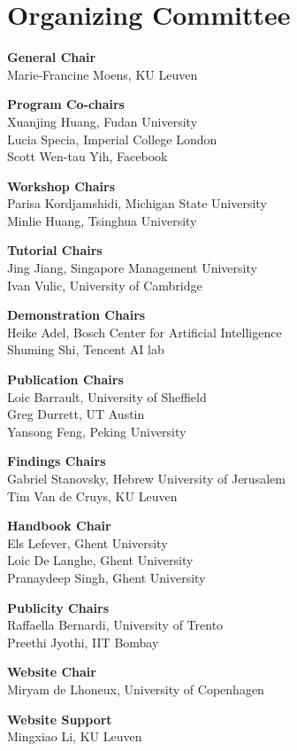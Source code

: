 
\section{Organizing Committee}

\setlength{\parindent}{0pt}

{\bf General Chair} \\
Marie-Francine Moens, KU Leuven

{\bf Program Co-chairs} \\
Xuanjing Huang, Fudan University\\
Lucia Specia, Imperial College London\\
Scott Wen-tau Yih, Facebook

{\bf Workshop Chairs} \\
Parisa Kordjamshidi, Michigan State University\\
Minlie Huang, Tsinghua University

{\bf Tutorial Chairs} \\
Jing Jiang, Singapore Management University \\
Ivan Vulic, University of Cambridge

{\bf Demonstration Chairs} \\
Heike Adel, Bosch Center for Artificial Intelligence \\
Shuming Shi, Tencent AI lab

{\bf Publication Chairs} \\
Loic Barrault, University of Sheffield \\
Greg Durrett, UT Austin \\
Yansong Feng, Peking University

{\bf Findings Chairs} \\
Gabriel Stanovsky, Hebrew University of Jerusalem \\
Tim Van de Cruys, KU Leuven

{\bf Handbook Chair} \\
Els Lefever, Ghent University\\
Loic De Langhe, Ghent University\\
Pranaydeep Singh, Ghent University

{\bf Publicity Chairs} \\
Raffaella Bernardi, University of Trento \\
Preethi Jyothi, IIT Bombay

{\bf Website Chair} \\
Miryam de Lhoneux, University of Copenhagen

{\bf Website Support} \\
Mingxiao Li, KU Leuven

